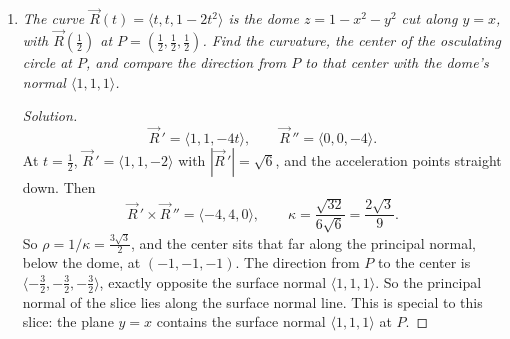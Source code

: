 \documentclass[12pt]{article}
\newenvironment{solution}
  {\renewcommand\qedsymbol{$\blacksquare$}\begin{proof}[Solution]}
  {\end{proof}}
\newcounter{topic}
\begin{document}
\begin{enumerate}
\begin{enumerate}
    \begin{solution}
    Curvature is how hard a curve bends, and its reciprocal is the radius of the osculating circle there. For $y=x^2$,
    \[
      \kappa=\frac{|y''|}{(1+(y')^2)^{3/2}},\qquad \text{at }x=0,\ \kappa=\frac{2}{1}=2,
    \]
    so the osculating circle at the vertex has radius $\tfrac12$. For the ellipse $\vec r(t)=\langle2\cos t,\sin t\rangle$, the plane curvature is $\kappa=\dfrac{2}{|\vec r\,'|^3}$ with $|\vec r\,'|^2=4\sin^2t+\cos^2t$.

    \medskip\noindent\textbf{At $(2,0)$, $t=0$} $|\vec r\,'|=1$, so $\kappa=2$, radius $\tfrac12$, center $\bigl(\tfrac32,0\bigr)$. The pointy end bends hard.

    \medskip\noindent\textbf{At $(0,1)$, $t=\pi/2$} $|\vec r\,'|=2$, so $\kappa=\tfrac14$, radius $4$, center $(0,-3)$. The flat top bends gently.

    \begin{center}
    \end{center}
    \end{solution}

    \item \textit{The curve $\vec R(t)=\langle t,t,1-2t^2\rangle$ is the dome $z=1-x^2-y^2$ cut along $y=x$, with $\vec R(\tfrac12)$ at $P=(\tfrac12,\tfrac12,\tfrac12)$. Find the curvature, the center of the osculating circle at $P$, and compare the direction from $P$ to that center with the dome's normal $\langle1,1,1\rangle$.}

    \begin{solution}
    \[
      \vec R\,'=\langle1,1,-4t\rangle,\qquad \vec R\,''=\langle0,0,-4\rangle.
    \]
    At $t=\tfrac12$, $\vec R\,'=\langle1,1,-2\rangle$ with $|\vec R\,'|=\sqrt6$, and the acceleration points straight down. Then
    \[
      \vec R\,'\times\vec R\,''=\langle-4,4,0\rangle,\qquad
      \kappa=\frac{\sqrt{32}}{6\sqrt6}=\frac{2\sqrt3}{9}.
    \]
    So $\rho=1/\kappa=\tfrac{3\sqrt3}{2}$, and the center sits that far along the principal normal, below the dome, at $(-1,-1,-1)$. The direction from $P$ to the center is $\langle-\tfrac32,-\tfrac32,-\tfrac32\rangle$, exactly opposite the surface normal $\langle1,1,1\rangle$. So the principal normal of the slice lies along the surface normal line. This is special to this slice: the plane $y=x$ contains the surface normal $\langle1,1,1\rangle$ at $P$.
    \end{solution}

    \end{enumerate}
\newpage
\setcounter{topic}{\value{enumi}}
\end{enumerate}
\end{document}
